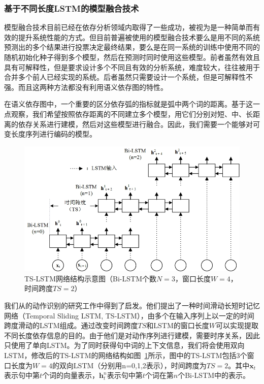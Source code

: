 \subsubsection{基于不同长度LSTM的模型融合技术}

模型融合技术目前已经在依存分析领域内取得了一些成功，被视为是一种简单而有效的提升系统性能的方式。但目前普遍被使用的模型融合技术要么是用不同的系统预测出的多个结果进行投票决定最终结果，要么是在同一系统的训练中使用不同的随机初始化种子得到多个模型，然后在预测时同时使用这些模型。前者虽然有效且具有可解释性，但是要求设计多个不同且有效的分析系统，难度较大，往往被用于合并多个前人已经实现的系统。后者虽然只需要设计一个系统，但是可解释性不强。而且这两种方法都没有利用语义依存图的特性。

在语义依存图中，一个重要的区分依存弧的指标就是弧中两个词的距离。基于这一点观察，我们希望按照依存距离的不同建立多个模型，用它们分别对短、中、长距离的依存关系进行建模，然后对这些模型进行融合。因此，我们需要一个能够对可变长度序列进行编码的模型。

\begin{figure}[hbtp]
	\centering
	\includegraphics[width=130mm]{picture/ts-lstm.jpg}
	\caption{TS-LSTM网络结构示意图（Bi-LSTM个数$N=3$，窗口长度$W=4$，时间跨度$TS=2$）}
	\label{fig:ts-lstm}
\end{figure}

我们从的动作识别的研究工作中得到了启发。他们提出了一种时间滑动长短时记忆网络（Temporal Sliding LSTM, TS-LSTM），由多个在输入序列上以一定的时间跨度滑动的LSTM组成。通过改变时间跨度$TS$和LSTM的窗口长度$W$可以实现提取不同长度依存信息的目的。由于他们是对动作序列进行建模，需要时序关系，因此只使用了单向LSTM。为了同时获得句中词的上下文信息，我们将会使用双向LSTM，修改后的TS-LSTM的网络结构如图~\ref{fig:ts-lstm}所示，图中的TS-LSTM包括3个窗口长度为$W=4$的双向LSTM（分别用n=0,1,2表示），时间跨度为$TS=2$。其中$\mathbf{x}_t$表示句中第$t$个词的向量表示，$\mathbf{h}^n_t$表示句中第$t$个词在第$n$个Bi-LSTM中的表示。

